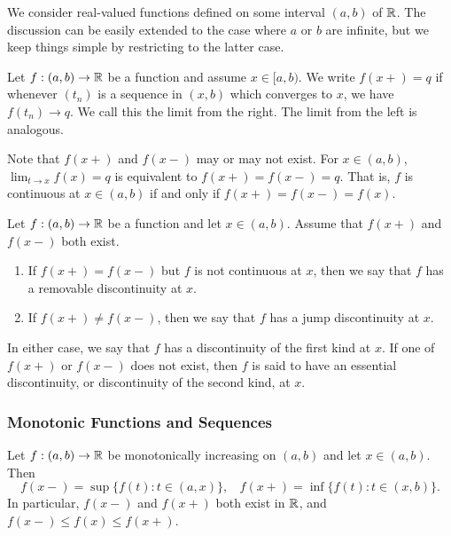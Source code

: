 \documentclass[12pt]{article} %
\begin{document}
We consider real-valued functions defined on some interval $(a, b)$ of $\mathbb{R}$. The discussion can be easily extended to the case where $a$ or $b$ are infinite, but we keep things simple by restricting to the latter case.

\begin{definition}
    Let $f : (a, b) \to \mathbb{R}$ be a function and assume $x \in [a, b)$. We write $f(x+) = q$ if whenever $(t_n)$ is a sequence in $(x, b)$ which converges to $x$, we have $f(t_n) \to q$. We call this the limit from the right. The limit from the left is analogous.
\end{definition}

\begin{remark}
    Note that $f(x+)$ and $f(x-)$ may or may not exist. For $x \in (a, b)$, $\lim_{t \to x} f(x) = q$ is equivalent to $f(x+) = f(x-) = q$. That is, $f$ is continuous at $x \in (a,b)$ if and only if ${f(x+) = f(x-) = f(x)}$.
\end{remark}

\begin{definition}
    Let $f : (a, b) \to \mathbb{R}$ be a function and let $x \in (a,b)$. Assume that $f(x+)$ and $f(x-)$ both exist. \begin{enumerate}
        \item If $f(x+) = f(x-)$ but $f$ is not continuous at $x$, then we say that $f$ has a removable discontinuity at $x$.
        \item If $f(x+) \neq f(x-)$, then we say that $f$ has a jump discontinuity at $x$.
    \end{enumerate} In either case, we say that $f$ has a discontinuity of the first kind at $x$. If one of $f(x+)$ or $f(x-)$ does not exist, then $f$ is said to have an essential discontinuity, or discontinuity of the second kind, at $x$.
\end{definition}

\subsubsection{Monotonic Functions and Sequences}

\begin{theorem}
    Let $f : (a, b) \to \mathbb{R}$ be monotonically increasing on $(a, b)$ and let $x \in (a, b)$. Then \[f(x-) = \sup\{f(t) : t \in (a, x)\}, \ \ \ \ f(x+) = \inf\{f(t) : t \in (x, b)\}.\] In particular, $f(x-)$ and $f(x+)$ both exist in $\mathbb{R}$, and $f(x-) \leq f(x) \leq f(x+)$.
\end{theorem}
\end{document}
